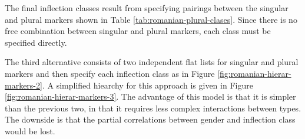 \begin{figure}
{}
\end{figure}

The final inflection classes result from specifying pairings between the singular and plural markers shown in Table \ref{tab:romanian-plural-clases}. Since there is no free combination between singular and plural markers, each class must be specified directly.

The third alternative consists of two independent flat lists for singular and plural markers and then specify each inflection class as in Figure \ref{fig:romanian-hierar-markers-2}. A simplified hiearchy for this approach is given in Figure \ref{fig:romanian-hierar-markers-3}. The advantage of this model is that it is simpler than the previous two, in that it requires less complex interactions between types. The downside is that the partial correlations between gender and inflection class would be lost.

